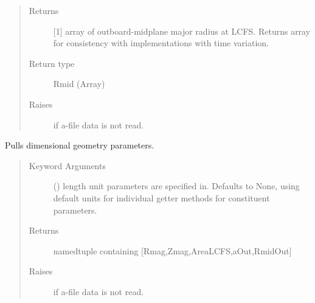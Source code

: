 \documentclass[letterpaper,10pt,english]{sphinxmanual}
\begin{document}
\begin{fulllineitems}
\begin{fulllineitems}
\begin{quote}
\begin{description}
\item[{Returns}] \leavevmode
{[}1{]} array of outboard-midplane major radius at LCFS.
Returns array for consistency with
{\hyperref[\detokenize{eqtools:eqtools.core.Equilibrium}]{}}
implementations with time variation.

\item[{Return type}] \leavevmode
Rmid (Array)

\item[{Raises}] \leavevmode
{} \textendash{} if a-file data is not read.

\end{description}\end{quote}

\end{fulllineitems}


\begin{fulllineitems}
\label{\detokenize{eqtools:eqtools.eqdskreader.EqdskReader.getGeometry}}
Pulls dimensional geometry parameters.
\begin{quote}\begin{description}
\item[{Keyword Arguments}] \leavevmode
{} () \textendash{} length unit parameters are specified in.
Defaults to None, using default units for individual getter
methods for constituent parameters.

\item[{Returns}] \leavevmode
namedtuple containing {[}Rmag,Zmag,AreaLCFS,aOut,RmidOut{]}

\item[{Raises}] \leavevmode
{} \textendash{} if a-file data is not read.

\end{description}\end{quote}

\end{fulllineitems}



\end{fulllineitems}
\end{document}
